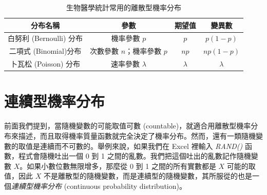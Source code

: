    \begin{table}[htbp]
        \begin{center}
            \begin{tabular}{cccc}
                \toprule
                分布名稱 & 參數 & 期望值 & 變異數\\
                \hline
                白努利 (Bernoulli) 分布 & 機率參數 $p$ & $p$ & $p(1-p)$\\
                二項式 (Binomial)分布 & 次數參數 $n$；機率參數 $p$ & $np$ & $np(1-p)$\\
                卜瓦松 (Poisson) 分布 & 速率參數 $\lambda$ & $\lambda$ & $\lambda$\\
                \bottomrule
            \end{tabular}
            \caption{生物醫學統計常用的離散型機率分布\label{tab:discrete_distribution}}
        \end{center}
    \end{table}
    
\section{連續型機率分布}

    前面我們提到，當隨機變數的可能取值可數 (countable)，就適合用離散型機率分布來描述，而且取得機率質量函數就完全決定了機率分布。然而，還有一類隨機變數的取值是連續而不可數的。舉例來說，如果我們在 Excel 裡輸入 \textit{RAND()} 函數，程式會隨機吐出一個 0 到 1 之間的亂數。我們把這個吐出的亂數記作隨機變數 $X$。如果小數位數無限增多，那麼從 0 到 1 之間的所有實數都是 $X$ 可能的取值，因此 $X$ 不是離散型的隨機變數，而是連續型的隨機變數，其所服從的也是一個\textit{連續型機率分布} (continuous probability distribution)。

    \medskip

